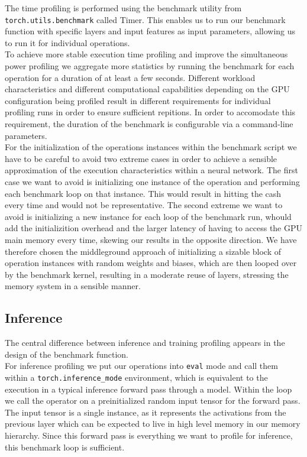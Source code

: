 The time profiling is performed using the benchmark utility from \texttt{torch.utils.benchmark} called Timer. This enables us to run our benchmark function with specific layers and input features as input parameters, allowing us to run it for individual operations. \\
To achieve more stable execution time profiling and improve the simultaneous power profiling we aggregate more statistics by running the benchmark for each operation for a duration of at least a few seconds. Different workload characteristics and different computational capabilities depending on the GPU configuration being profiled result in different requirements for individual profiling runs in order to ensure sufficient repitions. In order to accomodate this requirement, the duration of the benchmark is configurable via a command-line parameters. \\
For the initialization of the operations instances within the benchmark script we have to be careful to avoid two extreme cases in order to achieve a sensible approximation of the execution characteristics within a neural network. The first case we want to avoid is initializing one instance of the operation and performing each benchmark loop on that instance. This would result in hitting the cash every time and would not be representative. The second extreme we want to avoid is initializing a new instance for each loop of the benchmark run, whould add the initializition overhead and the larger latency of having to access the GPU main memory every time, skewing our results in the opposite direction. We have therefore chosen the middleground approach of initializing a sizable block of operation instances with random weights and biases, which are then looped over by the benchmark kernel, resulting in a moderate reuse of layers, stressing the memory system in a sensible manner. \\


\subsection{Inference}
The central difference between inference and training profiling appears in the design of the benchmark function. \\
For inference profiling we put our operations into \texttt{eval} mode and call them within a \texttt{torch.inference\_mode} environment, which is equivalent to the execution in a typical inference forward pass through a model. Within the loop we call the operator on a preinitialized random input tensor for the forward pass. The input tensor is a single instance, as it represents the activations from the previous layer which can be expected to live in high level memory in our memory hierarchy. Since this forward pass is everything we want to profile for inference, this benchmark loop is sufficient.

